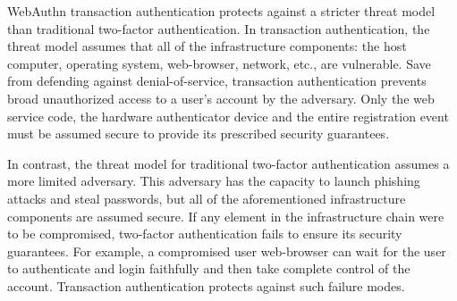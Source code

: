 
WebAuthn transaction authentication protects against a stricter threat model than traditional two-factor authentication. In transaction authentication, the threat model assumes that all of the infrastructure components: the host computer, operating system, web-browser, network, etc., are vulnerable. Save from defending against denial-of-service, transaction authentication prevents broad unauthorized access to a user's account by the adversary. Only the web service code, the hardware authenticator device and the entire registration event must be assumed secure to provide its prescribed security guarantees.

In contrast, the threat model for traditional two-factor authentication assumes a more limited adversary. This adversary has the capacity to launch phishing attacks and steal passwords, but all of the aforementioned infrastructure components are assumed secure. If any element in the infrastructure chain were to be compromised, two-factor authentication fails to ensure its security guarantees. For example, a compromised user web-browser can wait for the user to authenticate and login faithfully and then take complete control of the account. Transaction authentication protects against such failure modes.






